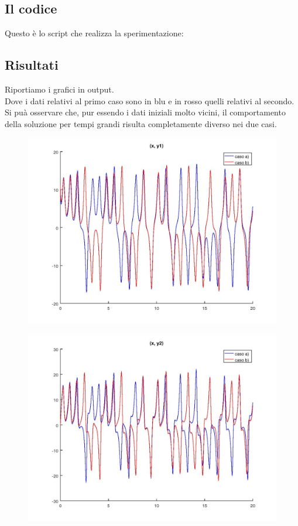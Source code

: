 \documentclass{article}
\begin{document}
	\subsection{Il codice}
	Questo è lo script che realizza la sperimentazione:
	
	
	\subsection{Risultati}
	Riportiamo i grafici in output.\\
	Dove i dati relativi al primo caso sono in blu e in rosso quelli relativi al secondo.\\
	Si puà osservare che, pur essendo i dati iniziali molto vicini, il comportamento della soluzione per tempi grandi risulta completamente diverso nei
	due casi.\\
	\begin{figure}[htp!]
		\centering 
		\includegraphics[width=\textwidth]{6_2_1.jpeg}
	\end{figure}
	\begin{figure}[htp!]
	\centering 
	\includegraphics[width=\textwidth]{6_2_2.jpeg}
	\end{figure}
\end{document}
